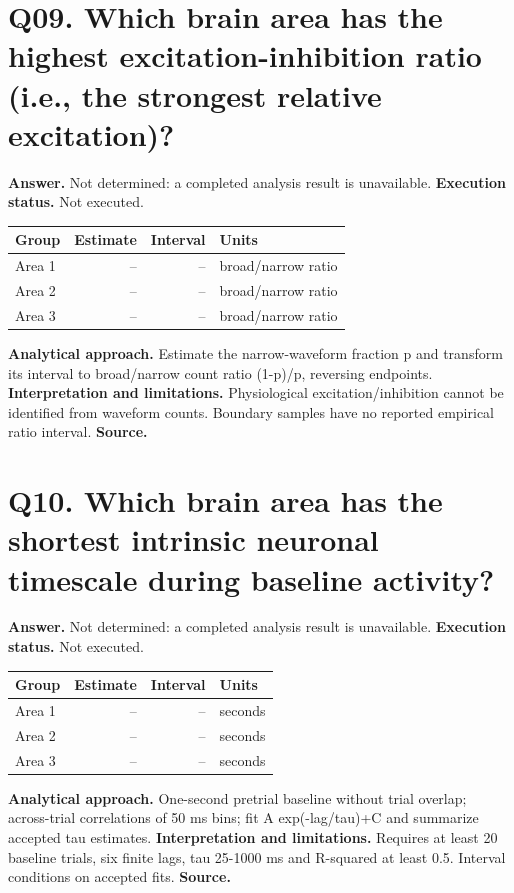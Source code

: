 \documentclass[11pt,a4paper]{article}
\begin{document}
\section*{Q09. Which brain area has the highest excitation-inhibition ratio (i.e., the strongest relative excitation)?}
\textbf{Answer.} Not determined: a completed analysis result is unavailable.
\textbf{Execution status.} Not executed.
\begin{tabularx}{\linewidth}{XrrX}\toprule Group & Estimate & Interval & Units \\\midrule
Area 1 & -- & -- & broad/narrow ratio \\
Area 2 & -- & -- & broad/narrow ratio \\
Area 3 & -- & -- & broad/narrow ratio \\
\bottomrule\end{tabularx}
\textbf{Analytical approach.} Estimate the narrow-waveform fraction p and transform its interval to broad/narrow count ratio (1-p)/p, reversing endpoints.
\textbf{Interpretation and limitations.} Physiological excitation/inhibition cannot be identified from waveform counts. Boundary samples have no reported empirical ratio interval.
\textbf{Source.} 
\clearpage
\section*{Q10. Which brain area has the shortest intrinsic neuronal timescale during baseline activity?}
\textbf{Answer.} Not determined: a completed analysis result is unavailable.
\textbf{Execution status.} Not executed.
\begin{tabularx}{\linewidth}{XrrX}\toprule Group & Estimate & Interval & Units \\\midrule
Area 1 & -- & -- & seconds \\
Area 2 & -- & -- & seconds \\
Area 3 & -- & -- & seconds \\
\bottomrule\end{tabularx}
\textbf{Analytical approach.} One-second pretrial baseline without trial overlap; across-trial correlations of 50 ms bins; fit A exp(-lag/tau)+C and summarize accepted tau estimates.
\textbf{Interpretation and limitations.} Requires at least 20 baseline trials, six finite lags, tau 25-1000 ms and R-squared at least 0.5. Interval conditions on accepted fits.
\textbf{Source.} 
\clearpage
\end{document}
